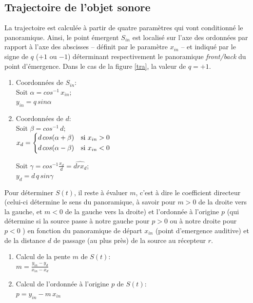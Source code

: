 \subsection*{Trajectoire de l'objet sonore}

La trajectoire est calcul\'ee \`a partir de quatre param\`etres qui vont conditionn\'e le panoramique. Ainsi, le point \'emergent $S_{in}$ est localis\'e  sur l'axe des ordonn\'ees par rapport \`a l'axe des abscisses -- d\'efinit par le param\`etre $x_{in}$ -- et indiqu\'e par le signe de $q$  ($+1$ ou $-1$) d\'eterminant respectivement le panoramique \textit{front/back} du point d'\'emergence. Dans le cas de la figure \ref{tra}, la valeur de  $q=+1$.%

\begin{enumerate}
\item Coordonn\'ees de $S_{in}$:\\  
Soit $\alpha = cos^{-1} \,x_{in}$;\\
$y_{in}=q\, sin \alpha$
\item Coordonn\'ees de $d$:\\ 
Soit $\beta = cos^{-1} \, d$;\\

$
   x_{d}=
\begin{dcases}
    d\, cos(\alpha + \beta)& \text{si } x_{in}>0\\
    d\, cos(\alpha - \beta)& \text{si } x_{in}<0
\end{dcases}
$

 Soit $\gamma =cos^{-1} \displaystyle \frac{x_d}{d}=\widehat{drx_d}$;\\
 $y_d=d\, q \,sin \gamma$
 \end{enumerate}
 
 \bigskip
 
 Pour d\'eterminer $S(t)$, il reste \`a \'evaluer $m$, c'est \`a dire le coefficient directeur (celui-ci d\'etermine le sens du panoramique, \`a savoir pour $m>0$ de la droite vers la gauche, et $m<0$ de la gauche vers la droite) et l'ordonn\'ee \`a l'origine $p$ (qui d\'etermine si la source passe \`a notre gauche pour $p>0$ ou \`a notre droite pour $p<0$ ) en fonction du panoramique de d\'epart $x_{in}$ (point d'emergence auditive) et de la distance $d$ de passage (au plus pr\`es) de la source au r\'ecepteur $r$.
 
 \begin{enumerate}[resume]
\item Calcul de la pente $m$ de $S(t)$:\\ 
$m=\displaystyle \frac{y_{in} - y_d}{x_{in} - x_d}$
\item Calcul de l'ordonn\'ee \`a l'origine $p$ de $S(t)$:\\ 
$p=y_{in} - m \, x_{in}$
 \end{enumerate}
 
